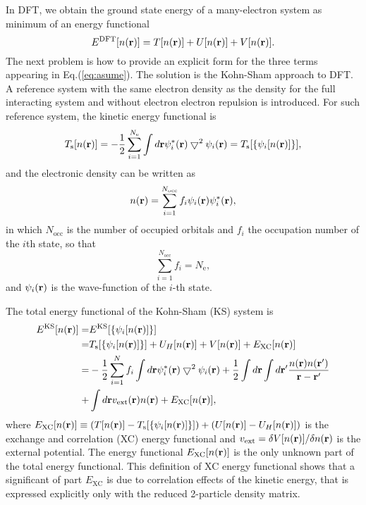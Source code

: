 In DFT, we obtain the ground state energy of a many-electron system as minimum of an energy functional
\begin{equation}
E^{\text{DFT}}[n({\bf r})] = T[{n (\bf r)}] + U[n({\bf r})] + V[n(\bf r)].
\label{eq:asume}
\end{equation}
The next problem is how to provide an explicit form for the three terms appearing in Eq.\thinspace(\ref{eq:asume}). 
The solution is the Kohn-Sham approach to DFT. 
A reference system with the same electron density as the density for the full interacting system  and without electron electron repulsion is introduced. 
For such reference system, the kinetic energy functional is
\begin{equation}
        T_\text{s}[n({\bf r})]= - \frac{1}{2}\sum_{i=1}^{N_{\text{e}}}\int d{\bf r} \psi_i^*({\bf r})\bigtriangledown^2\psi_i({\bf r})
        = T_\text{s}[\{\psi_i[n({\bf r})]\}],
 \label{eq:kinetic_ks}
\end{equation}
and the electronic density can be written as 
\begin{equation}
n({\bf r})=\sum_{i=1}^{N_{\text{occ}}}f_i \psi_i({\bf r})\psi_i^*({\bf r}),
\end{equation}
in which $N_{\text{occ}}$ is the number of occupied orbitals and $f_i$ the occupation number of the $i$th state, so that
\begin{equation}
 \sum_{i=1}^{N_{\text{occ}}}f_i =N_{\text{e}},
\end{equation}
and $\psi_i({\bf r})$ is the wave-function of the $i$-th state. 

The total energy functional of the Kohn-Sham (KS) system is
\begin{align}
 E^{\text{KS}}[n({\bf r})]=&E^{\text{KS}}[\{\psi_i[n({\bf r})]\}]  \nonumber \\
        =&T_\text{s}[\{\psi_i[n({\bf r})]\}] +U_H[n({\bf r})] +V[n({\bf r})]+E_{\text{XC}}[n({\bf r})] \label{eq:T_s} \\
 =&-\frac{1}{2}\sum_{i=1}^N f_i \int d{\bf r} \psi_i^*({\bf r})\bigtriangledown^2\psi_i({\bf r})
 +\frac{1}{2}\int d{\bf r} \int d{\bf r}'\frac{n({\bf r})n({\bf r}')}{{\bf r}-{\bf r}'}  \nonumber \\
+&\int d{\bf r} v_{\text{ext}}({\bf r})n({\bf r}) + E_{\text{XC}}[n({\bf r})], \label{eq:E_KS}
 \end{align}
 where $ E_{\text{XC}}[n({\bf r})] \equiv (T[n({\bf r})] - T_\text{s}[\{\psi_i[n({\bf r})]\}])+(U[n({\bf r})]-U_H[n({\bf r})])$ 
 is the exchange and correlation (XC) energy functional and 
$v_{\text{ext}}=\delta V[n({\bf r})]/\delta n({\bf r})$ is the external potential. 
The energy functional $ E_{\text{XC}}[n({\bf r})]$ is the only unknown part of the total energy functional.
This definition of XC energy functional shows that a significant of part $E_{\text{XC}}$ is due to correlation effects 
of the kinetic energy, that is expressed explicitly only with the reduced 2-particle density matrix.


